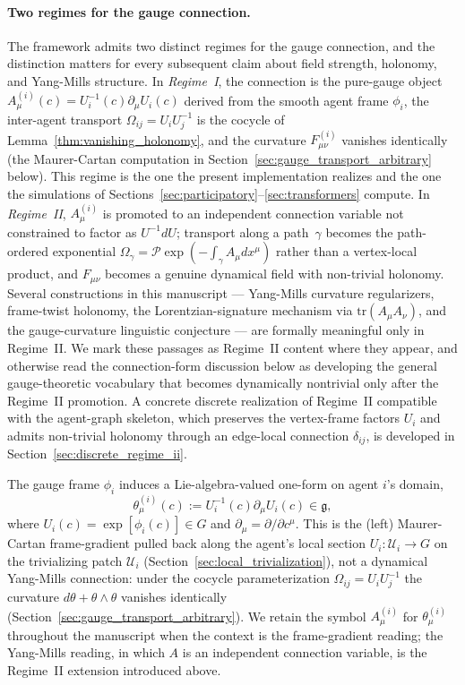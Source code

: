 \documentclass[11pt]{article}
\begin{document}
\paragraph{Two regimes for the gauge connection.} The framework admits two distinct regimes for the gauge connection, and the distinction matters for every subsequent claim about field strength, holonomy, and Yang-Mills structure. In \emph{Regime~I}, the connection is the pure-gauge object $A^{(i)}_\mu(c) = U_i^{-1}(c)\partial_\mu U_i(c)$ derived from the smooth agent frame $\phi_i$, the inter-agent transport $\Omega_{ij} = U_iU_j^{-1}$ is the cocycle of Lemma~\ref{thm:vanishing_holonomy}, and the curvature $F^{(i)}_{\mu\nu}$ vanishes identically (the Maurer-Cartan computation in Section~\ref{sec:gauge_transport_arbitrary} below). This regime is the one the present implementation realizes and the one the simulations of Sections~\ref{sec:participatory}--\ref{sec:transformers} compute. In \emph{Regime~II}, $A^{(i)}_\mu$ is promoted to an independent connection variable not constrained to factor as $U^{-1}dU$; transport along a path~$\gamma$ becomes the path-ordered exponential $\Omega_\gamma = \mathcal{P}\exp(-\int_\gamma A_\mu  dx^\mu)$ rather than a vertex-local product, and $F_{\mu\nu}$ becomes a genuine dynamical field with non-trivial holonomy. Several constructions in this manuscript — Yang-Mills curvature regularizers, frame-twist holonomy, the Lorentzian-signature mechanism via $\mathrm{tr}(A_\mu A_\nu)$, and the gauge-curvature linguistic conjecture — are formally meaningful only in Regime~II. We mark these passages as Regime~II content where they appear, and otherwise read the connection-form discussion below as developing the general gauge-theoretic vocabulary that becomes dynamically nontrivial only after the Regime~II promotion. A concrete discrete realization of Regime~II compatible with the agent-graph skeleton, which preserves the vertex-frame factors $U_i$ and admits non-trivial holonomy through an edge-local connection $\delta_{ij}$, is developed in Section~\ref{sec:discrete_regime_ii}.

The gauge frame $\phi_i$ induces a Lie-algebra-valued one-form on agent $i$'s domain,
\begin{equation}
\theta^{(i)}_\mu(c) := U_i^{-1}(c) \partial_\mu U_i(c) \in \mathfrak{g},
\label{eq:connection_form}
\end{equation}
where $U_i(c) = \exp[\phi_i(c)] \in G$ and $\partial_\mu = \partial/\partial c^\mu$. This is the (left) Maurer-Cartan frame-gradient pulled back along the agent's local section $U_i: \mathcal{U}_i \to G$ on the trivializing patch $\mathcal{U}_i$ (Section~\ref{sec:local_trivialization}), not a dynamical Yang-Mills connection: under the cocycle parameterization $\Omega_{ij} = U_i U_j^{-1}$ the curvature $d\theta + \theta \wedge \theta$ vanishes identically (Section~\ref{sec:gauge_transport_arbitrary}). We retain the symbol $A^{(i)}_\mu$ for $\theta^{(i)}_\mu$ throughout the manuscript when the context is the frame-gradient reading; the Yang-Mills reading, in which $A$ is an independent connection variable, is the Regime~II extension introduced above.
\end{document}
